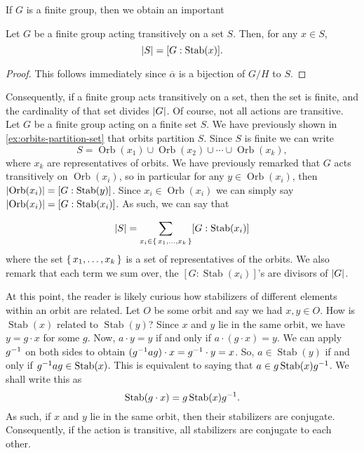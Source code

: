 \documentclass[./main.tex]{subfiles}
\begin{document}
If $G$ is a finite group, then we obtain an important 
\begin{corollary}
    Let $G$ be a finite group acting transitively on a set $S$. Then, for any $x \in S$, 
    \[
        \abs S = [G: \operatorname{Stab}(x)].
    \]
\end{corollary}
\begin{proof}
    This follows immediately since $\overline \alpha$ is a bijection of $G/H$ to $S$.
\end{proof}
Consequently, if a finite group acts transitively on a set, then the set is
finite, and the cardinality of that set divides $\abs G$. Of course, not all
actions are transitive. Let $G$ be a finite group acting on a finite set $S$. We
have previously shown in \cref{ex:orbits-partition-set} that orbits partition
$S$. Since $S$ is finite we can write 
\begin{equation}
\label{eqn:partition-of-set-into-orbits}
    S = \operatorname{Orb}(x_1) \cup \operatorname{Orb}(x_2) \cup \cdots \cup \operatorname{Orb}(x_k),
\end{equation}
where $x_k$ are representatives of orbits. We have previously remarked that $G$
acts transitively on $\operatorname{Orb}(x_i)$, so in particular for any $y \in
\operatorname{Orb}(x_i)$, then $\abs{\operatorname{Orb}(x_i)} = [G:
\operatorname{Stab}(y)]$. Since $x_i \in \operatorname{Orb}(x_i)$ we can simply
say $\abs{\operatorname{Orb}(x_i)} = [G:\operatorname{Stab}(x_i)]$.
As such, we can say that 

\begin{equation}
\label{eqn:enumeration-of-elements-of-finite-set-under-action}
    \abs S = \sum_{x_i \in \set{x_1, \dots, x_k}} [G:\operatorname{Stab}(x_i)]
\end{equation}
where the set $\set{x_1, \dots, x_k}$ is a set of representatives of the orbits.
We also remark that each term we sum over, the $[G:\operatorname{Stab}(x_i)]$'s
are divisors of $\abs G$. 

At this point, the reader is likely curious how stabilizers of different
elements within an orbit are related. Let $O$ be some orbit and say we had $x, y
\in O$. How is $\operatorname{Stab}(x)$ related to $\operatorname{Stab}(y)$?
Since $x$ and $y$ lie in the same orbit, we have $y = g \cdot x$ for some $g$.
Now, $a \cdot y = y$ if and only if $a \cdot (g \cdot x) = y$. We can apply
$g^{-1}$ on both sides to obtain $(g^{-1} a g) \cdot x = g^{-1} \cdot y = x$. So,
$a \in \operatorname{Stab}(y)$ if and only if $g^{-1} a g \in
\operatorname{Stab}(x)$. This is equivalent to saying that $a \in
g\operatorname{Stab}(x)g^{-1}$. We shall write this as 
\begin{equation}
\label{eqn:stabilizers-are-conjugate-within-same-orbit}
    \operatorname{Stab}(g \cdot x) = g\operatorname{Stab}(x)g^{-1}.
\end{equation}
As such, if $x$ and $y$ lie in the same orbit, then their stabilizers are
conjugate. Consequently, if the action is transitive, all stabilizers are
conjugate to each other.
\end{document}
